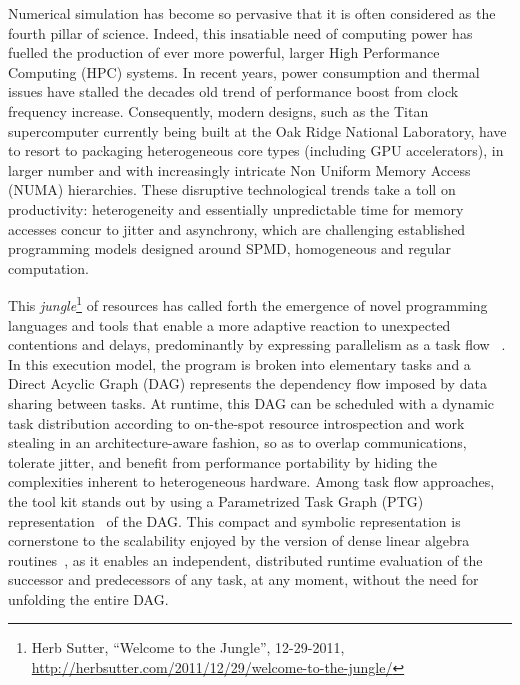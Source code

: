 
Numerical simulation has become so pervasive that it is often considered
as the fourth pillar of science. Indeed, this insatiable need of
computing power has fuelled the production of ever more powerful, larger
High Performance Computing (HPC) systems. In recent years, power
consumption and thermal issues have stalled the decades old trend of
performance boost from clock frequency increase. Consequently, modern
designs, such as the Titan supercomputer currently being built at the
Oak Ridge National Laboratory, have to resort to packaging heterogeneous
core types (including GPU accelerators), in larger number and with
increasingly intricate Non Uniform Memory Access (NUMA) hierarchies.
These disruptive technological trends take a toll on productivity:
heterogeneity and essentially unpredictable time for memory accesses concur
to jitter and asynchrony, which are challenging established programming
models designed around SPMD, homogeneous and regular computation.


This \emph{jungle}\footnote{Herb Sutter, ``Welcome to the Jungle'',
12-29-2011,
\url{http://herbsutter.com/2011/12/29/welcome-to-the-jungle/}} of
resources has called forth the emergence of novel programming languages
and tools that enable a more adaptive reaction to unexpected contentions
and delays, predominantly by expressing parallelism as a
task flow ~\cite{springerlink:10.1007/978-3-642-19328-6_5,PBL08,FYD09,DAGuE:PARCO,ATNW11,charm}.
In this execution model, the program is broken into elementary tasks and
a Direct Acyclic Graph (DAG) represents the dependency flow imposed by
data sharing between tasks. At runtime, this DAG can be scheduled with a
dynamic task distribution according to on-the-spot resource
introspection and work stealing in an architecture-aware fashion, so as
to overlap communications, tolerate jitter, and benefit from performance
portability by hiding the complexities inherent to heterogeneous
hardware. Among task flow approaches, the \dague tool kit stands out by
using a Parametrized Task Graph (PTG) representation~\cite{CJY04} of the
DAG. This compact and symbolic representation is cornerstone to the
scalability enjoyed by the \dague version of dense linear
algebra routines~\cite{DAGuE:PARCO}, as it enables an independent,
distributed runtime evaluation of the successor and predecessors of any
task, at any moment, without the need for unfolding the entire DAG.

